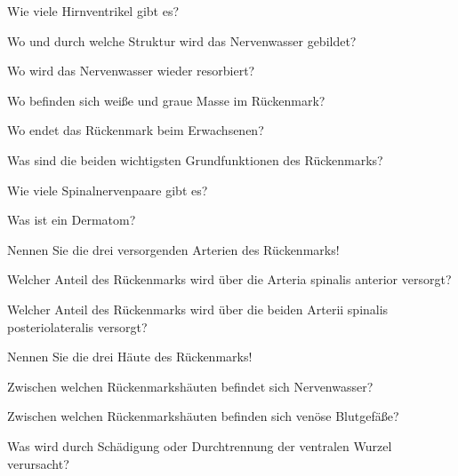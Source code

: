 \documentclass[10pt, a4paper]{exam}
\begin{document}
\begin{questions}
  \question Wie viele Hirnventrikel gibt es?
  \begin{solution}
  \end{solution}
  \question Wo und durch welche Struktur wird das Nervenwasser gebildet?
  \begin{solution}
  \end{solution}
  \question Wo wird das Nervenwasser wieder resorbiert?
  \begin{solution}
  \end{solution}
  \question Wo befinden sich weiße und graue Masse im Rückenmark?
  \begin{solution}
  \end{solution}
  \question Wo endet das Rückenmark beim Erwachsenen?
  \begin{solution}
  \end{solution}
  \question Was sind die beiden wichtigsten Grundfunktionen des Rückenmarks?
  \begin{solution}
  \end{solution}
  \question Wie viele Spinalnervenpaare gibt es?
  \begin{solution}
  \end{solution}
  \question Was ist ein Dermatom?
  \begin{solution}
  \end{solution}
  \question Nennen Sie die drei versorgenden Arterien des Rückenmarks!
  \begin{solution}
  \end{solution}
  \question Welcher Anteil des Rückenmarks wird über die Arteria spinalis anterior versorgt?
  \begin{solution}
  \end{solution}
  \question Welcher Anteil des Rückenmarks wird über die beiden Arterii spinalis posteriolateralis versorgt?
  \begin{solution}
  \end{solution}
  \question Nennen Sie die drei Häute des Rückenmarks!
  \begin{solution}
  \end{solution}
  \question Zwischen welchen Rückenmarkshäuten befindet sich Nervenwasser?
  \begin{solution}
  \end{solution}
  \question Zwischen welchen Rückenmarkshäuten befinden sich venöse Blutgefäße?
  \begin{solution}
  \end{solution}
  \question Was wird durch Schädigung oder Durchtrennung der ventralen Wurzel verursacht?

\end{questions}
\end{document}
